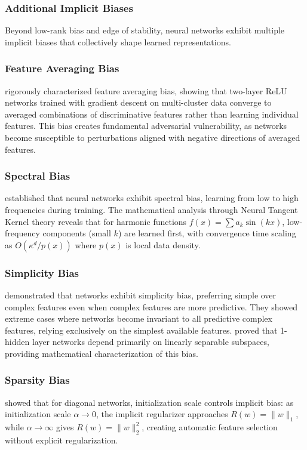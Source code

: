 \documentclass[11pt]{article}
\begin{document}
\subsubsection*{Additional Implicit Biases}

Beyond low-rank bias and edge of stability, neural networks exhibit multiple implicit biases that collectively shape learned representations.

\subsubsection{Feature Averaging Bias}
\citet{li2024feature} rigorously characterized feature averaging bias, showing that two-layer ReLU networks trained with gradient descent on multi-cluster data converge to averaged combinations of discriminative features rather than learning individual features. This bias creates fundamental adversarial vulnerability, as networks become susceptible to perturbations aligned with negative directions of averaged features.

\subsubsection{Spectral Bias}
\citet{rahaman2019spectral} established that neural networks exhibit spectral bias, learning from low to high frequencies during training. The mathematical analysis through Neural Tangent Kernel theory reveals that for harmonic functions $f(x) = \sum a_k \sin(kx)$, low-frequency components (small $k$) are learned first, with convergence time scaling as $O(\kappa^d/p(x))$ where $p(x)$ is local data density.

\subsubsection{Simplicity Bias}
\citet{shah2020pitfalls} demonstrated that networks exhibit simplicity bias, preferring simple over complex features even when complex features are more predictive. They showed extreme cases where networks become invariant to all predictive complex features, relying exclusively on the simplest available features. \citet{morwani2023simplicity} proved that 1-hidden layer networks depend primarily on linearly separable subspaces, providing mathematical characterization of this bias.

\subsubsection{Sparsity Bias}
\citet{woodworth2020kernel} showed that for diagonal networks, initialization scale controls implicit bias: as initialization scale $\alpha \to 0$, the implicit regularizer approaches $R(w) = \|w\|_1$, while $\alpha \to \infty$ gives $R(w) = \|w\|_2^2$, creating automatic feature selection without explicit regularization.
\end{document}
